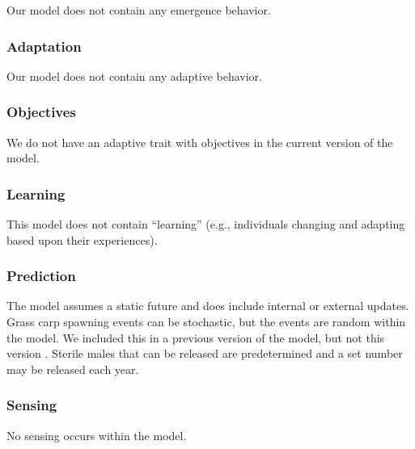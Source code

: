 \documentclass{article}[12pt]
\begin{document}
Our model does not contain any emergence behavior.

\subsubsection{Adaptation}

Our model does not contain any adaptive behavior.

\subsubsection{Objectives}

We do not have an adaptive trait with objectives in the current version of the model.

\subsubsection{Learning}

This model does not contain ``learning'' (e.g., individuals changing and adapting based upon their experiences). 

\subsubsection{Prediction}

The model assumes a static future and does include internal or external updates. 
Grass carp spawning events can be stochastic, but the events are random within the model.
We included this in a previous version of the model, but not this version \citep{Erickson:2017ecomod}.
Sterile males that can be released are predetermined and a set number may be released each year.


\subsubsection{Sensing}

No sensing occurs within the model. 
\end{document}

